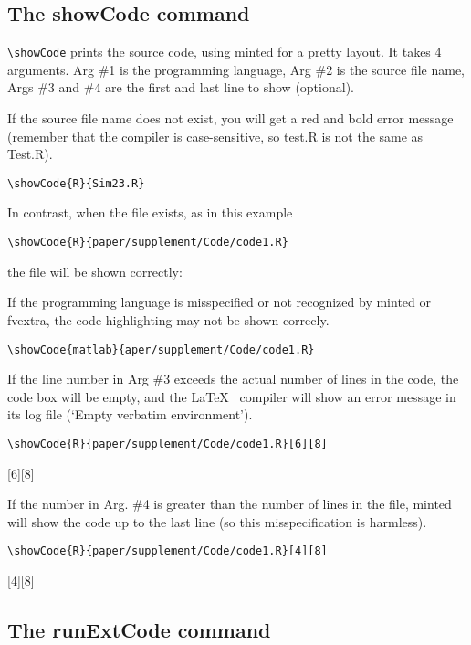\documentclass[a4paper,10pt]{article}
\begin{document}
\subsection*{The showCode command}
\verb|\showCode| prints the source code, using minted for a pretty layout. It takes 4 arguments.
Arg \#1 is the programming language,
Arg \#2 is the source file name,
Args \#3 and \#4 are the first and last line to show (optional).
 
If the source file name does not exist, you will get a red and bold error message (remember that the compiler is case-sensitive, so test.R is not the same as Test.R).
\begin{verbatim}\showCode{R}{Sim23.R}
\end{verbatim}

\bigskip
In contrast, when the file exists, as in this example
\begin{verbatim}\showCode{R}{paper/supplement/Code/code1.R}
\end{verbatim}
the file will be shown correctly:


If the programming language is misspecified or not recognized by minted or fvextra, the code highlighting may not be shown correcly.
\begin{verbatim}\showCode{matlab}{aper/supplement/Code/code1.R}
\end{verbatim}

If the line number in Arg \#3 exceeds the actual number of lines in the code, the code box will be empty, and the \LaTeX~ compiler will show an error message in its log file (`Empty verbatim environment').
\begin{verbatim}\showCode{R}{paper/supplement/Code/code1.R}[6][8]
\end{verbatim}
[6][8]

If the number in Arg. \#4 is greater than the number of lines in the file, minted will show the code up to the last line (so this misspecification is harmless).
\begin{verbatim}\showCode{R}{paper/supplement/Code/code1.R}[4][8]
\end{verbatim}
[4][8]

\subsection*{The runExtCode command}
\end{document}
